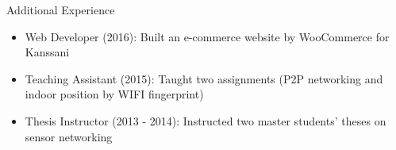 \documentclass[]{mcdowellcv}
\begin{document}
	\begin{cvsection}{Additional Experience}
		\begin{cvsubsection}{}{}{}	
			\begin{itemize}
				\item Web Developer (2016): Built an e-commerce website by WooCommerce for Kanssani
				\item Teaching Assistant (2015): Taught two assignments (P2P networking and indoor position by WIFI fingerprint)
				\item Thesis Instructor (2013 - 2014): Instructed two master students' theses on sensor networking
			\end{itemize}
		\end{cvsubsection}
	\end{cvsection}
	
\end{document}
